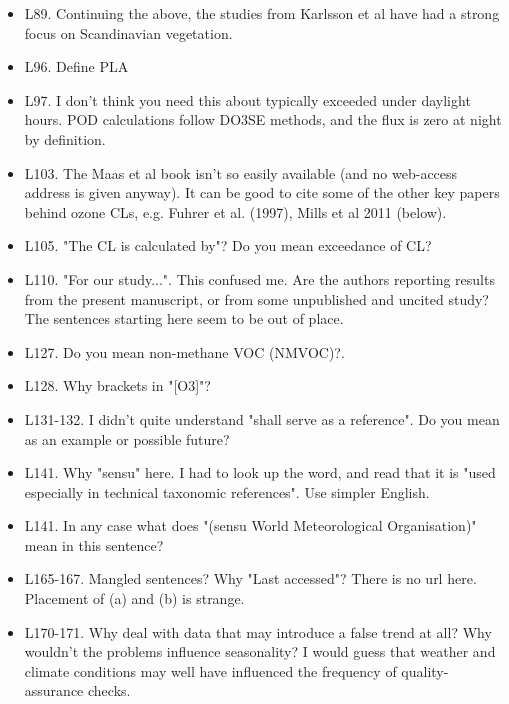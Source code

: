 \documentclass{scrartcl}
\begin{document}
\begin{itemize}
\item {\color{blue}L89. Continuing the above, the studies from Karlsson et al have had a strong focus on Scandinavian vegetation.}

\item {\color{blue}L96. Define PLA}

\item {\color{blue}L97. I don't think you need this about typically exceeded under daylight hours. POD calculations follow DO3SE methods, and the flux is zero at night by definition.}

\item {\color{blue}L103. The Maas et al book isn't so easily available (and no web-access address is given anyway). It can be good to cite some of the other key papers behind ozone CLs, e.g. Fuhrer et al. (1997), Mills et al 2011 (below).}

\item {\color{blue}L105. "The CL is calculated by"? Do you mean exceedance of CL?}

\item {\color{blue}L110. "For our study...". This confused me. Are the authors reporting results from the present manuscript, or from some unpublished and uncited study? The sentences starting here seem to be out of place.}

\item {\color{blue}L127. Do you mean non-methane VOC (NMVOC)?.}

\item {\color{blue}L128. Why brackets in "[O3]"?}

\item {\color{blue}L131-132. I didn't quite understand "shall serve as a reference". Do you mean as an example or possible future?}

\item {\color{blue}L141. Why "sensu" here. I had to look up the word, and read that it is "used especially in technical taxonomic references". Use simpler English.}

\item {\color{blue}L141. In any case what does "(sensu World Meteorological Organisation)" mean in this sentence?}

\item {\color{blue}L165-167. Mangled sentences? Why "Last accessed"? There is no url here. Placement of (a) and (b) is strange.}

\item {\color{blue}L170-171. Why deal with data that may introduce a false trend at all? Why wouldn't the problems influence seasonality? I would guess that weather and climate conditions may well have influenced the frequency of quality-assurance checks.}


\end{itemize}
\end{document}
